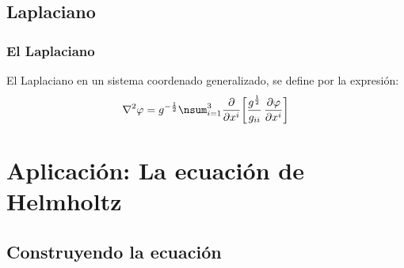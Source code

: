 \documentclass[12pt]{beamer}
\begin{document}
\subsection{Laplaciano}

\begin{frame}
\frametitle{El Laplaciano}
El Laplaciano en un sistema coordenado generalizado, se define por la expresión:
\pause
\begin{align*}
\laplacian{\varphi} = g^{-\frac{1}{2}} \nsum_{i=1}^{3} \pdv{x^{i}} \bigg[ \dfrac{g^{\frac{1}{2}}}{g_{ii}} \, \pdv{\varphi}{x^{i}}\bigg]
\end{align*}
\end{frame}

\section{Aplicación: La ecuación de Helmholtz}
\subsection{Construyendo la ecuación}
\end{document}
